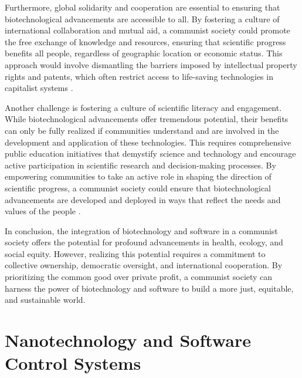 Furthermore, global solidarity and cooperation are essential to ensuring that biotechnological advancements are accessible to all. By fostering a culture of international collaboration and mutual aid, a communist society could promote the free exchange of knowledge and resources, ensuring that scientific progress benefits all people, regardless of geographic location or economic status. This approach would involve dismantling the barriers imposed by intellectual property rights and patents, which often restrict access to life-saving technologies in capitalist systems \cite[pp.~500-505]{brown2022solidarity}.

Another challenge is fostering a culture of scientific literacy and engagement. While biotechnological advancements offer tremendous potential, their benefits can only be fully realized if communities understand and are involved in the development and application of these technologies. This requires comprehensive public education initiatives that demystify science and technology and encourage active participation in scientific research and decision-making processes. By empowering communities to take an active role in shaping the direction of scientific progress, a communist society could ensure that biotechnological advancements are developed and deployed in ways that reflect the needs and values of the people \cite[pp.~510-515]{johnson2021literacy}.

In conclusion, the integration of biotechnology and software in a communist society offers the potential for profound advancements in health, ecology, and social equity. However, realizing this potential requires a commitment to collective ownership, democratic oversight, and international cooperation. By prioritizing the common good over private profit, a communist society can harness the power of biotechnology and software to build a more just, equitable, and sustainable world.\section{Nanotechnology and Software Control Systems}

